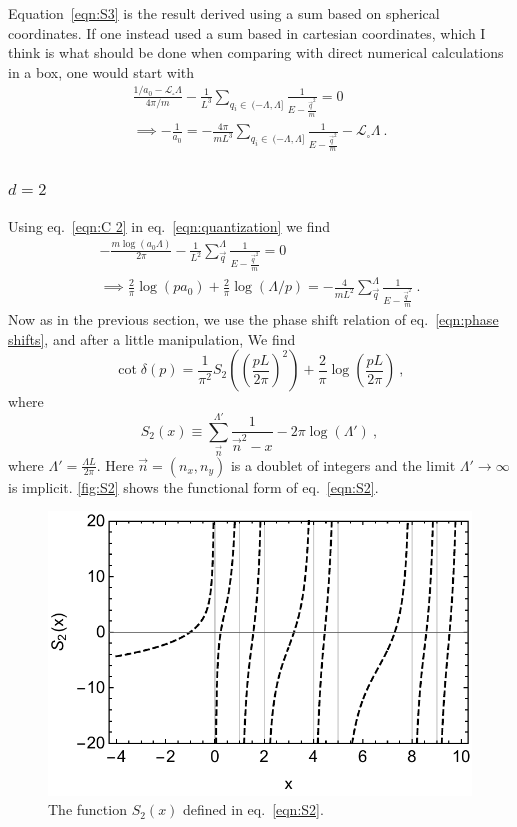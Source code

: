 \documentclass[11pt]{article}
\begin{document}
Equation~\eqref{eqn:S3} is the result derived using a sum based on spherical coordinates.  If one instead used a sum based in cartesian coordinates, which I think is what should be done when comparing with direct numerical calculations in a box, one would start with 
\begin{multline}
\frac{1/a_0-\mathcal{L}_\square\Lambda}{4\pi/m}-\frac{1}{L^3}\sum_{q_i\in\ (-\Lambda,\Lambda]}\frac { 1 } { E - \frac{\vec{q}^2}{m} }=0\\
\implies-\frac{1}{a_0}=-\frac{4\pi}{mL^3}\sum_{q_i\in\ (-\Lambda,\Lambda]} \frac { 1 } { E - \frac{\vec{q}^2}{m} }-\mathcal{L}_\square\Lambda\ .
\end{multline}


\subsubsection{$d=2$}
Using eq.~\eqref{eqn:C 2} in eq.~\eqref{eqn:quantization} we find
\begin{multline}
-\frac{m \log (a_0\Lambda)}{2 \pi }-\frac{1}{L^2}\sum_{\vec{q}}^\Lambda \frac { 1 } { E - \frac{\vec{q}^2}{m} }=0\\
\implies
\frac{2}{\pi}\log (pa_0)+\frac{2}{\pi}\log(\Lambda/p)=-\frac{4}{mL^2}\sum_{\vec{q}}^\Lambda \frac { 1 } { E - \frac{\vec{q}^2}{m} }\ .
\end{multline}
Now as in the previous section, we use the phase shift relation of eq.~\eqref{eqn:phase shifts}, and after a little manipulation, We find
\begin{equation}
\cot \delta(p)=\frac{1}{\pi^2}S_2\left(\left(\frac{pL}{2\pi}\right)^2\right)+\frac{2}{\pi}\log\left(\frac{pL}{2\pi}\right)\ ,
\end{equation}
where
\begin{equation}\label{eqn:S2}
S_2(x)\equiv\sum_{\vec{n}}^{\Lambda'} \frac { 1 } { \vec{n}^2 -x}-2\pi\log\left(\Lambda'\right)\ ,
\end{equation}
where $\Lambda'=\frac{\Lambda L}{2\pi}$.
Here $\vec{n}=(n_x,n_y)$ is a doublet of integers and the limit $\Lambda'\to\infty$ is implicit.   \autoref{fig:S2} shows the functional form of eq.~\eqref{eqn:S2}.
\begin{figure}
\center
\includegraphics[width=.8\columnwidth]{figure/S2.pdf}
\caption{The function $S_2(x)$ defined in eq.~\eqref{eqn:S2}.\label{fig:S2}}
\end{figure}
\end{document}
